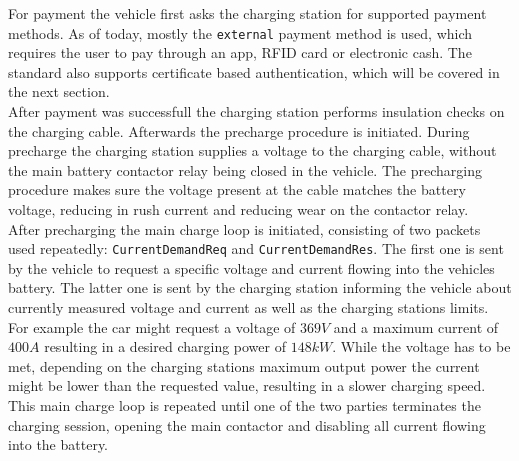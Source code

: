 \documentclass[conference,flushend]{iaria} %
\begin{document}
For payment the vehicle first asks the charging station for supported payment methods.
As of today, mostly the \verb'external' payment method is used, which requires the user to pay through an app, RFID card or electronic cash.
The standard also supports certificate based authentication, which will be covered in the next section. \\
After payment was successfull the charging station performs insulation checks on the charging cable.
Afterwards the precharge procedure is initiated.
During precharge the charging station supplies a voltage to the charging cable, without the main battery contactor relay being closed in the vehicle.
The precharging procedure makes sure the voltage present at the cable matches the battery voltage, reducing in rush current and reducing wear on the contactor relay. \\
After precharging the main charge loop is initiated, consisting of two packets used repeatedly: \verb'CurrentDemandReq' and \verb'CurrentDemandRes'.
The first one is sent by the vehicle to request a specific voltage and current flowing into the vehicles battery.
The latter one is sent by the charging station informing the vehicle about currently measured voltage and current as well as the charging stations limits.
For example the car might request a voltage of $369V$ and a maximum current of $400A$ resulting in a desired charging power of $148kW$.
While the voltage has to be met, depending on the charging stations maximum output power the current might be lower than the requested value, resulting in a slower charging speed. \\
This main charge loop is repeated until one of the two parties terminates the charging session, opening the main contactor and disabling all current flowing into the battery.
\end{document}
